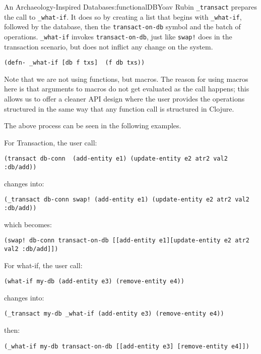 \begin{aosachapter}{An Archaeology-Inspired Database}{s:functionalDB}{Yoav Rubin}
\texttt{\_transact} prepares the call to \texttt{\_what-if}. It does so
by creating a list that begins with \texttt{\_what-if}, followed by the
database, then the \texttt{transact-on-db} symbol and the batch of
operations. \texttt{\_what-if} invokes \texttt{transact-on-db}, just
like \texttt{swap!} does in the transaction scenario, but does not
inflict any change on the system.

\begin{verbatim}
(defn- _what-if [db f txs]  (f db txs))
\end{verbatim}

Note that we are not using functions, but macros. The reason for using
macros here is that arguments to macros do not get evaluated as the call
happens; this allows us to offer a cleaner API design where the user
provides the operations structured in the same way that any function
call is structured in Clojure.

The above process can be seen in the following examples.

For Transaction, the user call:

\begin{verbatim}
(transact db-conn  (add-entity e1) (update-entity e2 atr2 val2 :db/add))  
\end{verbatim}

changes into:

\begin{verbatim}
(_transact db-conn swap! (add-entity e1) (update-entity e2 atr2 val2 :db/add))
\end{verbatim}

which becomes:

\begin{verbatim}
(swap! db-conn transact-on-db [[add-entity e1][update-entity e2 atr2 val2 :db/add]])
\end{verbatim}

For what-if, the user call:

\begin{verbatim}
(what-if my-db (add-entity e3) (remove-entity e4))
\end{verbatim}

changes into:

\begin{verbatim}
(_transact my-db _what-if (add-entity e3) (remove-entity e4))
\end{verbatim}

then:

\begin{verbatim}
(_what-if my-db transact-on-db [[add-entity e3] [remove-entity e4]])
\end{verbatim}


\end{aosachapter}
